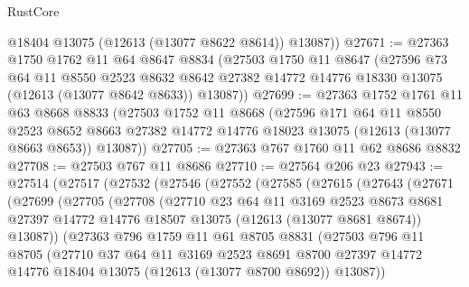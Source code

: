 \begin{lexlean}{RustCore}
\begin{coremodule}
        @18404
        @13075
        (@12613 (@13077 @8622 @8614))
        @13087))
@27671 := @27363
    @1750
    @1762
    @11
    @64
    @8647
    @8834
    (@27503
      @1750
      @11
      @8647
      (@27596
        @73
        @64
        @11
        @8550
        @2523
        @8632
        @8642
        @27382
        @14772
        @14776
        @18330
        @13075
        (@12613 (@13077 @8642 @8633))
        @13087))
@27699 := @27363
    @1752
    @1761
    @11
    @63
    @8668
    @8833
    (@27503
      @1752
      @11
      @8668
      (@27596
        @171
        @64
        @11
        @8550
        @2523
        @8652
        @8663
        @27382
        @14772
        @14776
        @18023
        @13075
        (@12613 (@13077 @8663 @8653))
        @13087))
@27705 := @27363 @767 @1760 @11 @62 @8686 @8832
@27708 := @27503 @767 @11 @8686
@27710 := @27564 @206 @23
@27943 := @27514
    (@27517
      (@27532
        (@27546
          (@27552
            (@27585
              (@27615
                (@27643
                  (@27671
                    (@27699
                      (@27705
                        (@27708
                          (@27710
                            @23
                            @64
                            @11
                            @3169
                            @2523
                            @8673
                            @8681
                            @27397
                            @14772
                            @14776
                            @18507
                            @13075
                            (@12613 (@13077 @8681 @8674))
                            @13087))
                        (@27363
                          @796
                          @1759
                          @11
                          @61
                          @8705
                          @8831
                          (@27503
                            @796
                            @11
                            @8705
                            (@27710
                              @37
                              @64
                              @11
                              @3169
                              @2523
                              @8691
                              @8700
                              @27397
                              @14772
                              @14776
                              @18404
                              @13075
                              (@12613 (@13077 @8700 @8692))
                              @13087))

\end{coremodule}
\end{lexlean}
